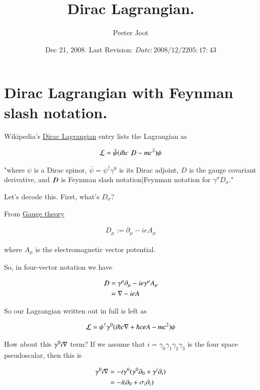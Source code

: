 \documentclass{article}
\title{ Dirac Lagrangian. }
\author{Peeter Joot}
\date{ Dec 21, 2008.  Last Revision: $Date: 2008/12/22 05:17:43 $ }
\newcommand{\Dslash}[0]{ \not\!D }
\begin{document}
\maketitle{}
\tableofcontents

\section{ Dirac Lagrangian with Feynman slash notation. }

Wikipedia's \href{http://en.wikipedia.org/wiki/Lagrangian#Dirac_Lagrangian}{Dirac Lagrangian} entry lists the Lagrangian as

\begin{align*}
\LL = \bar \psi (i \hbar c \Dslash - mc^2) \psi
\end{align*}

"where $\psi\!$ is a Dirac spinor, $\bar \psi = \psi^\dagger \gamma^0$ is its Dirac adjoint, $D\!$ is the gauge covariant derivative, and $\Dslash$ is Feynman slash notation|Feynman notation for $\gamma^\sigma D_\sigma\!$."

Let's decode this.  First, what's $D_\sigma$?

From \href{http://en.wikipedia.org/wiki/Gauge_covariant_derivative}{Gauge theory}

\begin{align*}
D_\mu := \partial_\mu - i e A_\mu
\end{align*}

where $A_\mu$ is the electromagnetic vector potential.

So, in four-vector notation we have

\begin{align*}
\Dslash 
&= \gamma^\mu \partial_\mu - i e \gamma^\mu A_\mu \\
&= \grad - i e A \\
\end{align*}

So our Lagrangian written out in full is left as

\begin{align}\label{eqn:lag1}
\mathcal{L} = \psi^\dagger \gamma^0 ( i \hbar c \nabla + \hbar c e A - mc^2) \psi
\end{align}

How about this $\gamma^0 i \nabla$ term?  If we assume that $i = \gamma_0 \gamma_1 \gamma_2 \gamma_3$ is the four space pseudoscalar, then this is

\begin{align*}
\gamma^0 i \nabla
&= - i \gamma^0 (\gamma^0 \partial_0 + \gamma^i \partial_i) \\
&= - i (\partial_0 + \sigma_i \partial_i) \\
\end{align*}
\end{document}

